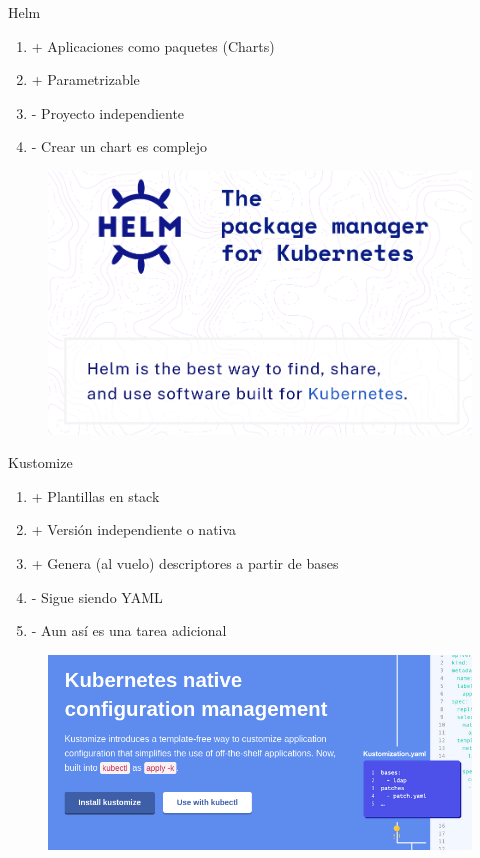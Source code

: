\documentclass[aspectratio=169]{beamer}
\begin{document}
\begin{frame}{Helm}

		\begin{enumerate}
			\item + Aplicaciones como paquetes (Charts) 
			\item + Parametrizable
			\item - Proyecto independiente
            \item - Crear un chart es complejo
		\end{enumerate}
        
        \begin{figure}
        \centering
        \includegraphics[width=0.6\linewidth]{Images/helm}
        \end{figure}


\end{frame}


\begin{frame}{Kustomize}

		\begin{enumerate}
			\item + Plantillas en stack
			\item + Versión independiente o nativa
            \item + Genera (al vuelo) descriptores a partir de bases
			\item - Sigue siendo YAML
            \item - Aun así es una tarea adicional
		\end{enumerate}
        
\begin{figure}
\centering
\includegraphics[width=0.6\linewidth]{Images/kustomize}
\end{figure}


\end{frame}
\end{document}
